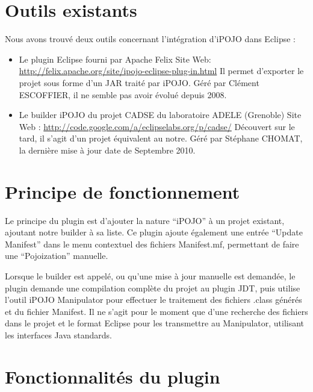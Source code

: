 \documentclass[letterpaper,10pt,french]{sphinxmanual}
\begin{document}
\section{Outils existants}
\label{developer/index:outils-existants}
Nous avons trouvé deux outils concernant l'intégration d'iPOJO dans Eclipse :
\begin{itemize}
\item {} 
Le plugin Eclipse fourni par Apache Felix
Site Web: \href{http://felix.apache.org/site/ipojo-eclipse-plug-in.html}{http://felix.apache.org/site/ipojo-eclipse-plug-in.html}
Il permet d'exporter le projet sous forme d'un JAR traité par iPOJO.
Géré par Clément ESCOFFIER, il ne semble pas avoir évolué depuis 2008.

\item {} 
Le builder iPOJO du projet CADSE du laboratoire ADELE (Grenoble)
Site Web : \href{http://code.google.com/a/eclipselabs.org/p/cadse/}{http://code.google.com/a/eclipselabs.org/p/cadse/}
Découvert sur le tard, il s'agit d'un projet équivalent au notre.
Géré par Stéphane CHOMAT, la dernière mise à jour date de Septembre 2010.

\end{itemize}


\section{Principe de fonctionnement}
\label{developer/index:principe-de-fonctionnement}
Le principe du plugin est d'ajouter la nature ``iPOJO'' à un projet existant,
ajoutant notre builder à sa liste.
Ce plugin ajoute également une entrée ``Update Manifest'' dans le menu contextuel
des fichiers Manifest.mf, permettant de faire une ``Pojoization'' manuelle.

Lorsque le builder est appelé, ou qu'une mise à jour manuelle est demandée, le
plugin demande une compilation complète du projet au plugin JDT, puis utilise
l'outil iPOJO Manipulator pour effectuer le traitement des fichiers .class
générés et du fichier Manifest.
Il ne s'agit pour le moment que d'une recherche des fichiers dans le projet et
le format Eclipse pour les transmettre au Manipulator, utilisant les interfaces
Java standards.


\section{Fonctionnalités du plugin}
\label{developer/index:fonctionnalites-du-plugin}
\end{document}

